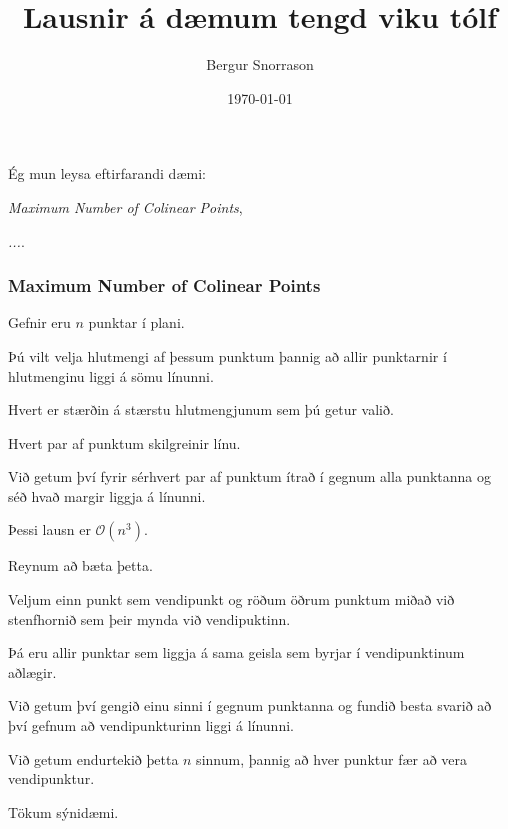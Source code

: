 \title{Lausnir á dæmum tengd viku tólf}
\author{Bergur Snorrason}
\date{\today}



\frame{\titlepage}

{
	{
		\item<1-> Ég mun leysa eftirfarandi dæmi:
		{
			\item<2-> \emph{Maximum Number of Colinear Points},
			\item<3-> \emph{...}.
		}
	}
}

{
	\frametitle{Maximum Number of Colinear Points}
	{
		\item<1-> Gefnir eru $n$ punktar í plani.
		\item<2-> Þú vilt velja hlutmengi af þessum punktum þannig að allir punktarnir í hlutmenginu liggi á sömu línunni.
		\item<3-> Hvert er stærðin á stærstu hlutmengjunum sem þú getur valið.
	}
}

{
	{
		\item<1-> Hvert par af punktum skilgreinir línu.
		\item<2-> Við getum því fyrir sérhvert par af punktum ítrað í gegnum alla punktanna og séð hvað margir liggja á línunni.
		\item<3-> Þessi lausn er $\mathcal{O}(n^3)$.
		\item<4-> Reynum að bæta þetta.
	}
}
{
	{
		\item<1-> Veljum einn punkt sem vendipunkt og röðum öðrum punktum miðað við stenfhornið sem þeir mynda við vendipuktinn.
		\item<2-> Þá eru allir punktar sem liggja á sama geisla sem byrjar í vendipunktinum aðlægir.
		\item<3-> Við getum því gengið einu sinni í gegnum punktanna og fundið besta svarið að því gefnum að vendipunkturinn liggi á línunni.
		\item<4-> Við getum endurtekið þetta $n$ sinnum, þannig að hver punktur fær að vera vendipunktur.
		\item<5-> Tökum sýnidæmi.
	}
}

